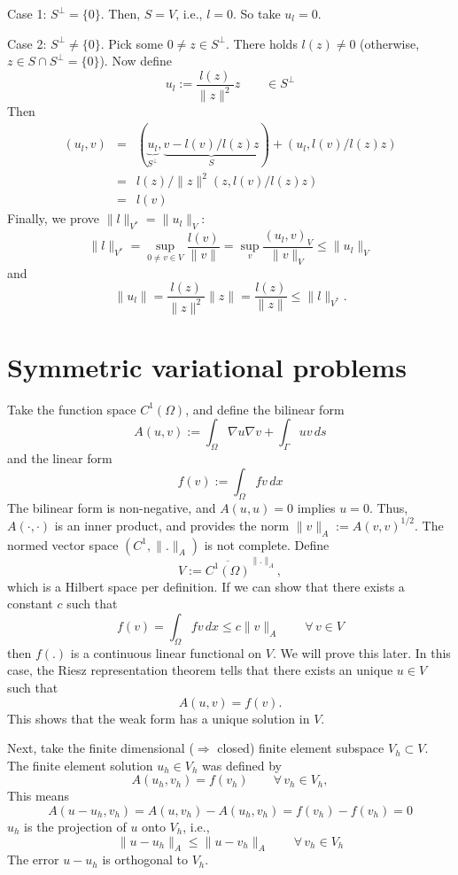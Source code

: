 \noindent
Case 1: $S^\bot = \{ 0 \}$. Then, $S = V$, i.e., $l = 0$. So take $u_l = 0$.

\noindent
Case 2: $S^\bot \neq \{ 0 \}$. Pick some $0 \neq z \in S^\bot$. There
holds $l(z) \neq 0$ (otherwise, $z \in S \cap S^\bot = \{ 0 \}$).
Now define 
$$
u_l := \frac{l(z)}{\|z\|^2} z \qquad \in S^\bot
$$
Then
\begin{eqnarray*}
(u_l,v) & = & (\underbrace{u_l}_{S^\bot}, \underbrace{v - l(v)/l(z) z}_S) + (u_l,l(v)/l(z)z) \\
& = & l(z) / \| z\|^2 (z,l(v)/l(z) z) \\
& = & l(v)
\end{eqnarray*}
Finally, we prove $\|l\|_{V^\ast} = \| u_l \|_V$:
$$
\|l\|_{V^\ast} = \sup_{0 \neq v \in V} \frac{l(v)}{\|v\|}
        = \sup_v \frac{(u_l,v)_V}{\|v\|_V} \leq \| u_l \|_V
$$
and
$$
\| u_l \| = \frac{l(z)}{\|z\|^2}  \|z\| = \frac{l(z)}{\|z\|} \leq \| l \|_{V^\ast}.
$$

\section{Symmetric variational problems}
Take the function space $C^1(\Omega)$, and define the bilinear form
$$
A(u,v) := \int_\Omega \nabla u \nabla v + \int_\Gamma u v \, ds
$$
and the linear form
$$
f(v) := \int_\Omega f v \, dx
$$
The bilinear form is non-negative, and $A(u,u) = 0$ implies $u = 0$.
Thus, $A(\cdot,\cdot)$ is an inner product, and provides the
norm $\|v\|_A := A(v,v)^{1/2}$. The normed vector space $(C^1, \|.\|_A)$
is not complete. Define
$$
V := \overline{C^1(\Omega)}^{\|.\|_A},
$$
which is a Hilbert space per definition. If we can show that there exists
a constant $c$ such that
$$
f(v) = \int_\Omega f v \, dx \leq c \| v \|_A \qquad \forall \, v \in V
$$
then $f(.)$ is a continuous linear functional on $V$.
We will prove this later. In this case, the Riesz representation theorem 
tells that there exists an unique $u \in V$ such that
$$
A(u,v) = f(v).
$$
This shows that the weak form has a unique solution in $V$.

Next, take the finite dimensional ($\Rightarrow$ closed) finite element subspace $V_h \subset V$.
The finite element solution $u_h \in V_h$ was defined by
$$
A(u_h,v_h) = f(v_h) \qquad \forall \, v_h \in V_h,
$$
This means
$$
A(u-u_h, v_h) = A(u,v_h) - A(u_h,v_h) = f(v_h) - f(v_h) = 0
$$
$u_h$ is the projection of $u$ onto $V_h$, i.e.,
$$
\| u - u_h \|_A \leq \| u - v_h \|_A \qquad \forall \, v_h \in V_h
$$
The error $u - u_h$ is orthogonal to $V_h$.


